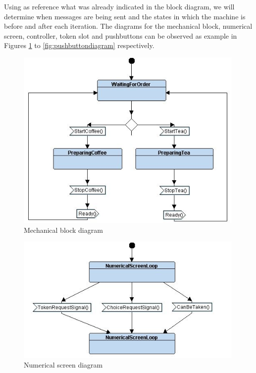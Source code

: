 \documentclass[12pt]{article}
\begin{document}
Using as reference what was already indicated in the block diagram, we will determine when messages are being sent and the states in which the machine is before and after each iteration. The diagrams for the mechanical block, numerical screen, controller, token slot and pushbuttons can be observed as example in Figures \ref{fig:mechdiagram} to \ref{fig:pushbuttondiagram} respectively.
\begin{figure}[htbp]
\centering
\includegraphics[width=0.99\textwidth]{fig/mechdiagram.jpg}
\caption{Mechanical block diagram} \label{fig:mechdiagram}
\end{figure}

\begin{figure}[htbp]
\centering
\includegraphics[width=0.99\textwidth]{fig/numdiagram.jpg}
\caption{Numerical screen diagram} \label{fig:numdiagram}
\end{figure}
\end{document}
